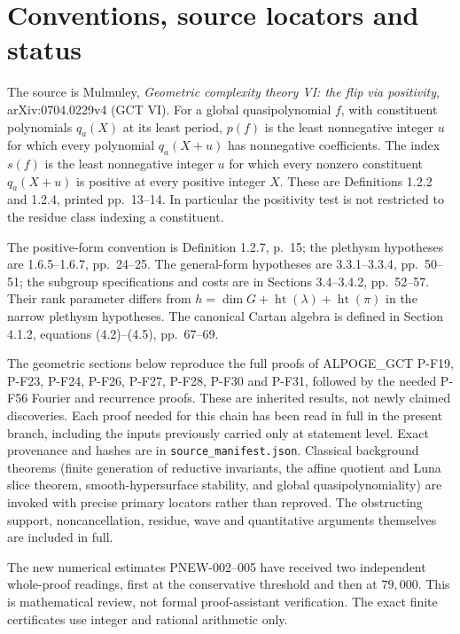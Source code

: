 \section{Conventions, source locators and status}
The source is Mulmuley, \emph{Geometric complexity theory VI:
the flip via positivity}, arXiv:0704.0229v4 (GCT VI).
For a global quasipolynomial $f$, with constituent polynomials
$q_a(X)$ at its least period, $p(f)$ is the least nonnegative
integer $u$ for which every polynomial $q_a(X+u)$ has
nonnegative coefficients.  The index $s(f)$ is the least
nonnegative integer $u$ for which every nonzero constituent
$q_a(X+u)$ is positive at every positive integer $X$.
These are Definitions 1.2.2 and 1.2.4, printed pp.~13--14.
In particular the positivity test is not restricted to the
residue class indexing a constituent.

The positive-form convention is Definition 1.2.7, p.~15;
the plethysm hypotheses are 1.6.5--1.6.7, pp.~24--25.
The general-form hypotheses are 3.3.1--3.3.4, pp.~50--51;
the subgroup specifications and costs are in Sections
3.4--3.4.2, pp.~52--57.  Their rank parameter differs from
$h=\dim G+\operatorname{ht}(\lambda)+\operatorname{ht}(\pi)$
in the narrow plethysm hypotheses.  The canonical Cartan algebra
is defined in Section 4.1.2, equations (4.2)--(4.5), pp.~67--69.

The geometric sections below reproduce the full proofs of
ALPOGE\_GCT P-F19, P-F23, P-F24, P-F26, P-F27, P-F28,
P-F30 and P-F31, followed by the needed P-F56 Fourier and
recurrence proofs.  These are inherited results, not newly
claimed discoveries.  Each proof needed for this chain has
been read in full in the present branch, including the inputs
previously carried only at statement level.  Exact provenance
and hashes are in \texttt{source\_manifest.json}.
Classical background theorems (finite generation of reductive
invariants, the affine quotient and Luna slice theorem,
smooth-hypersurface stability, and global quasipolynomiality)
are invoked with precise primary locators rather than reproved.
The obstructing support, noncancellation, residue, wave and
quantitative arguments themselves are included in full.

The new numerical estimates PNEW-002--005 have received two
independent whole-proof readings, first at the conservative
threshold and then at $79,000$.  This is mathematical review,
not formal proof-assistant verification.  The exact finite
certificates use integer and rational arithmetic only.

